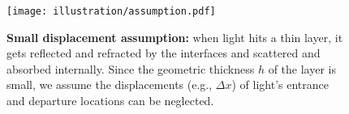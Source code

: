 \begin{figure}[t]
	\texttt{[image: illustration/assumption.pdf]}
	\caption{\label{fig:thin_layer}
		\textbf{Small displacement assumption:}
		when light hits a thin layer, it gets reflected and refracted by the interfaces and scattered and absorbed internally.
		Since the geometric thickness $h$ of the layer is small, we assume the displacements (e.g., $\Delta x$) of light's entrance and departure locations can be neglected.
	}
\end{figure}